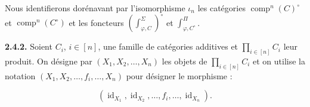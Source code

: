 Nous identifierons dorénavant par l'isomorphisme $\iota_n$ les catégories
$\operatorname{comp}^{n}(C)^\circ$ et
$\operatorname{comp}^{n}(C^\circ)$ et les foncteurs
$\left(\int_{\varphi,C}^{\Sigma}\right)^\circ$ et
$\int_{\varphi,C^\circ}^{\Pi}$.

\noindent\textbf{2.4.2.}\quad
Soient $C_i$, $i\in[n]$, une famille de catégories additives et
$\prod_{i\in[n]}C_i$ leur produit. On désigne par
$(X_1,X_2,\ldots,X_n)$ les objets de $\prod_{i\in[n]}C_i$ et on utilise
la notation $(X_1,X_2,\ldots,f_i,\ldots,X_n)$ pour désigner le morphisme :

\begin{equation*}
  (\operatorname{id}_{X_1},\operatorname{id}_{X_2},\ldots,
  f_i,\ldots,\operatorname{id}_{X_n}).
\end{equation*}
